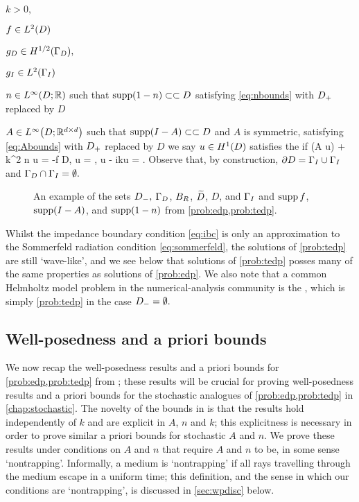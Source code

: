   \bit
  \item $k > 0,$
\item $f \in \LtD$
\item $\gD \in \HhGD,$
  \item $\gI \in \LtGI$
\item $n \in \LiDRR$ such that $\supp\mleft(1-n\mright) \compcont D$ satisfying \eqref{eq:nbounds} with $D_{+}$ replaced by $D$
\item $A \in \LiDRRdtd$ such that $\supp\mleft(I-A\mright)\compcont D$ and $A$ is symmetric, satisfying \eqref{eq:Abounds} with $D_{+}$ replaced by $D$
  \eit
  we say $u \in \HoD$ satisfies the  if
  \beq\label{eq:tedp}
\grad \cdot \mleft(A \grad u\mright) + k^2 n u = -f \tin D,
\eeq
\beqs
\trGD u = \gD, \ton \GD \tand
\eeqs
\beq\label{eq:ibc}
\dn u - ik\trGI u = \gI \ton \GI.
\eeq
\eprob
Observe that, by construction, $\partial D = \Gamma_{I} \cup \Gamma_{I}$ and $\Gamma_{D} \cap \Gamma_{I} = \emptyset.$

\begin{figure}
\begin{centering}

\caption{An example of the sets $D_{-},$ $\Gamma_{D}$, $B_{R}$, $\widetilde{D}$, $D$, and $\Gamma_{I}$ and $\operatorname{supp} f$, $\operatorname{supp}(I-A)$, and $\operatorname{supp}(1-n)$ from \cref{prob:edp,prob:tedp}.}
\end{centering}
\end{figure}

Whilst the impedance boundary condition \eqref{eq:ibc} is only an approximation to the Sommerfeld radiation condition \eqref{eq:sommerfeld}, the solutions of \cref{prob:tedp} are still `wave-like', and we  see below that solutions of \cref{prob:tedp} posses many of the same properties as solutions of \cref{prob:edp}. We also note that a common Helmholtz model problem in the numerical-analysis community is the , which is simply \cref{prob:tedp} in the case $D_{-} = \emptyset.$


  \subsection{Well-posedness and a priori bounds}\label{sec:wpbounds}

  We  now recap the well-posedness results and a priori bounds for \cref{prob:edp,prob:tedp} from \cite{GrPeSp:19}; these results will be crucial for proving well-posedness results and a priori bounds for the stochastic analogues of \cref{prob:edp,prob:tedp} in \cref{chap:stochastic}. The novelty of the bounds in \cite{GrPeSp:19} is that the results hold independently of $k$ and are explicit in $A$, $n$ and $k$; this explicitness is necessary in order to prove similar a priori bounds for stochastic $A$ and $n$. We prove these results under conditions on $A$ and $n$ that require $A$ and $n$ to be, in some sense `nontrapping'. Informally, a medium is `nontrapping' if all rays travelling through the medium escape in a uniform time; this definition, and the sense in which our conditions are `nontrapping', is discussed in \cref{sec:wpdisc} below.

